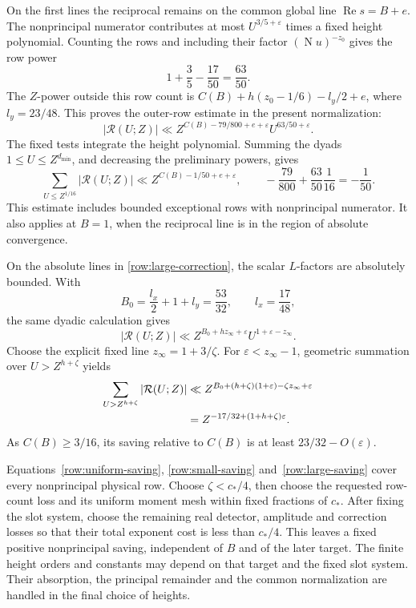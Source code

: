 \documentclass[11pt,a4paper]{article}
\numberwithin{equation}{section}
\theoremstyle{definition}
\theoremstyle{remark}
\newcommand{\eps}{\varepsilon}
\newcommand{\Rea}{\operatorname{Re}}
\newcommand{\Norm}{\operatorname{N}}
\begin{document}
On the first lines the reciprocal remains on the common global line
\(\Rea s=B+e\).  The nonprincipal numerator contributes at most
\(U^{3/5+\eps}\) times a fixed height polynomial.  Counting the rows
and including their factor \((\Norm u)^{-z_0}\) gives the row power
\[
 1+\frac35-\frac{17}{50}=\frac{63}{50}.
\]
The \(Z\)-power outside this row count is
\(C(B)+h(z_0-1/6)-l_y/2+e\), where \(l_y=23/48\).
This proves the outer-row estimate
\cite[Lemma 10.6]{Q} in the present normalization:
\begin{equation}\label{row:small-dyad}
 |\mathcal R(U;Z)|
 \ll Z^{C(B)-79/800+e+\eps}U^{63/50+\eps}.
\end{equation}
The fixed tests integrate the height polynomial.  Summing the dyads
\(1\le U\le Z^{d_{\min}}\), and decreasing the preliminary powers,
gives
\begin{equation}\label{row:small-saving}
 \sum_{U\le Z^{1/16}}|\mathcal R(U;Z)|
 \ll Z^{C(B)-1/50+e+\eps},
 \qquad
 -\frac{79}{800}+\frac{63}{50}\frac1{16}
 =-\frac1{50}.
\end{equation}
This estimate includes bounded exceptional rows with nonprincipal numerator.
It also applies at \(B=1\), when the reciprocal line is in the region
of absolute convergence.

On the absolute lines in \eqref{row:large-correction}, the scalar
\(L\)-factors are absolutely bounded.  With
\[
 B_0=\frac{l_x}{2}+1+l_y=\frac{53}{32},
 \qquad l_x=\frac{17}{48},
\]
the same dyadic calculation gives
\begin{equation}\label{row:large-dyad}
 |\mathcal R(U;Z)|
 \ll Z^{B_0+h z_\infty+\eps}U^{1+\eps-z_\infty}.
\end{equation}
Choose the explicit fixed line \(z_\infty=1+3/\zeta\).
For \(\eps<z_\infty-1\), geometric summation over
\(U>Z^{h+\zeta}\) yields
\begin{align}
 \sum_{U>Z^{h+\zeta}}|\mathcal R(U;Z)|
 &\ll Z^{B_0+(h+\zeta)(1+\eps)-\zeta z_\infty+\eps}\notag\\
 &=Z^{-17/32+(1+h+\zeta)\eps}.
 \label{row:large-saving}
\end{align}
As \(C(B)\ge3/16\), its saving relative to \(C(B)\) is at least
\(23/32-O(\eps)\).

Equations~\eqref{row:uniform-saving},
\eqref{row:small-saving} and~\eqref{row:large-saving} cover every
nonprincipal physical row.  Choose
\(\zeta<c_*/4\), then choose the requested row-count loss and its
uniform moment mesh within fixed fractions of \(c_*\).
After fixing the slot system, choose the remaining real detector,
amplitude and correction losses so that their total exponent cost is
less than \(c_*/4\).  This leaves a fixed positive nonprincipal saving,
independent of \(B\) and of the later target.  The finite height orders
and constants may depend on that target and the fixed slot system.
Their absorption, the principal remainder and the common
normalization are handled in the final choice of heights.
\end{document}
